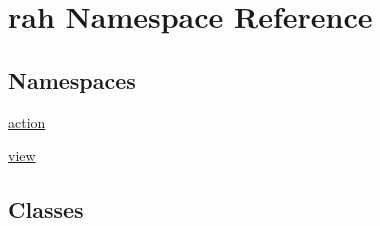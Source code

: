 \hypertarget{namespacerah}{}\section{rah Namespace Reference}
\label{namespacerah}
\subsection*{Namespaces}
\begin{DoxyCompactItemize}
\item 
 \mbox{\hyperlink{namespacerah_1_1action}{action}}
\item 
 \mbox{\hyperlink{namespacerah_1_1view}{view}}
\end{DoxyCompactItemize}
\subsection*{Classes}
